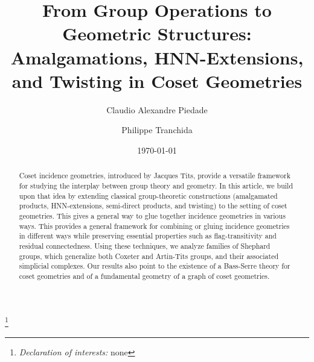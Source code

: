 \documentclass[11pt,letterpaper]{amsart}
\begin{document}
\title[From Group Operations to Geometric Structures]{From Group Operations to Geometric Structures: Amalgamations, HNN-Extensions, and Twisting in Coset Geometries}


\author[Claudio Alexandre Piedade]{Claudio Alexandre Piedade}
\address{Claudio Alexandre Piedade, Centro de Matemática da Universidade do Porto, Universidade do Porto, Portugal, Orcid number 0000-0002-0746-5893
}

\author[Philippe Tranchida]{Philippe Tranchida}
\address{Philippe Tranchida, Max Planck Institute for Mathematics in the Sciences, Inselstrasse 22 D-04107 Leipzig, Orcid number 0000-0003-0744-4934.
}


\thanks{\textit{Declaration of interests:} none}
\date{\today}


\begin{abstract}
    Coset incidence geometries, introduced by Jacques Tits, provide a versatile framework for studying the interplay between group theory and geometry. 
    In this article, we build upon that idea by extending classical group-theoretic constructions (amalgamated products, HNN-extensions, semi-direct products, and twisting) to the setting of coset geometries. This gives a general way to glue together incidence geometries in various ways. This provides a general framework for combining or gluing incidence geometries in different ways while preserving essential properties such as flag-transitivity and residual connectedness.
    Using these techniques, we analyze families of Shephard groups, which generalize both Coxeter and Artin-Tits groups, and their associated simplicial complexes.
    Our results also point to the existence of a Bass-Serre theory for coset geometries and of a fundamental geometry of a graph of coset geometries.
\end{abstract}
    

\maketitle
\end{document}

